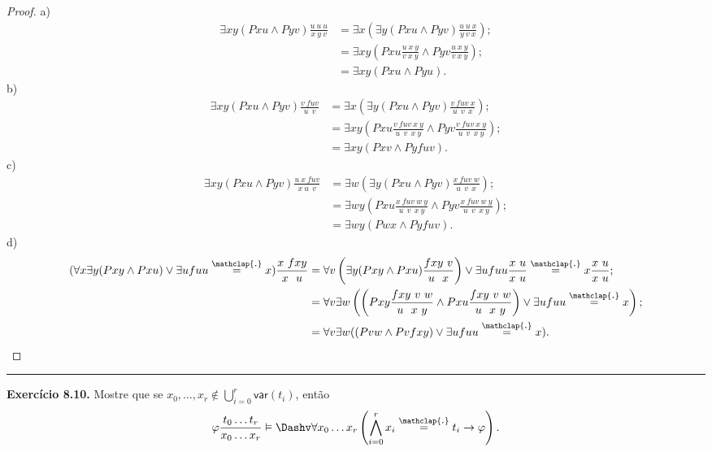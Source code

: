 \documentclass[11pt]{article}
\newcommand{\msf}[1]{\mathsf{#1}}
\newcommand\overtext[2]{\stackrel{\mathclap{\normalfont\mbox{#1}}}{#2}}
\begin{document}
\begin{proof}
    a)
    \begin{align*}
        \exists xy(Pxu\wedge Pyv)\frac{u~u~u}{x~y~v} & = \exists x\left(\exists y(Pxu\wedge Pyv)\frac{u~u~x}{y~v~x}\right);\\
        & = \exists xy\left(Pxu\frac{u~x~y}{v~x~y}\wedge Pyv\frac{u~x~y}{v~x~y}\right);\\
        & = \exists xy(Pxu\wedge Pyu).
    \end{align*}
    b)
    \begin{align*}
        \exists xy(Pxu\wedge Pyv)\frac{v~fuv}{u~~v} & = \exists x\left(\exists y(Pxu\wedge Pyv)\frac{v~fuv~x}{u~~v~~x}\right);\\
        & = \exists xy\left(Pxu\frac{v~fuv~x~y}{u~~v~~x~y}\wedge Pyv\frac{v~fuv~x~y}{u~~v~~x~y}\right);\\
        & = \exists xy(Pxv\wedge Pyfuv).
    \end{align*}
    c)
    \begin{align*}
        \exists xy(Pxu\wedge Pyv)\frac{u~x~fuv}{x~u~~v} & = \exists w\left(\exists y(Pxu\wedge Pyv)\frac{x~fuv~w}{u~~v~~x}\right);\\
        & = \exists wy\left(Pxu\frac{x~fuv~w~y}{u~~v~~x~y}\wedge Pyv\frac{x~fuv~w~y}{u~~v~~x~y}\right);\\
        & = \exists wy(Pwx\wedge Pyfuv).
    \end{align*}
    d)
    \begin{align*}
        (\forall x\exists y(Pxy\wedge Pxu)\vee\exists ufuu\overtext{.}{=}x)\frac{x~fxy}{x~~u} & =
        \forall v\left(\exists y(Pxy\wedge Pxu)\frac{fxy~v}{u~~x}\right)\vee\exists ufuu\frac{x~u}{x~u}\overtext{.}{=}x\frac{x~u}{x~u};\\
        & = \forall v\exists w\left(\left(Pxy\frac{fxy~v~w}{u~~x~y}\wedge Pxu\frac{fxy~v~w}{u~~x~y}\right)\vee \exists ufuu\overtext{.}{=}x\right);\\
        & = \forall v\exists w((Pvw\wedge Pvfxy)\vee\exists ufuu\overtext{.}{=}x).
    \end{align*}
\end{proof}

\hrule

\begin{shaded}
\textbf{Exercício 8.10.} Mostre que se $x_0,\dots,x_r\notin\bigcup_{i=0}^r\msf{var}(t_i)$, então
$$\varphi\frac{t_0\dots t_r}{x_0\dots x_r}\vDash\Dashv\forall x_0\dots x_r\left(\bigwedge_{i=0}^rx_i\overtext{.}{=}t_i\rightarrow\varphi\right).$$
\end{shaded}
\end{document}
